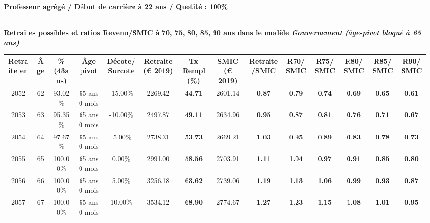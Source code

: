 {\bf \noindent Professeur agrégé / Début de carrière à 22 ans / Quotité : 100\%}  ~ 

 ~\\{\bf \noindent Retraites possibles et ratios Revenu/SMIC à 70, 75, 80, 85, 90 ans dans le modèle \emph{Gouvernement (âge-pivot bloqué à 65 ans)}}  
 
\begin{adjustbox}{max width=\textwidth} 
\begin{tabular}[htb]{|c|c||c|c|c||c|c||c|c||c|c|c|c|c|} 
\hline 
 Retraite en &  Âge &  \%(43ans) &  Âge pivot &  Décote/Surcote &  Retraite (\euro{} 2019) &  Tx Rempl(\%) &  SMIC (\euro{} 2019) &  Retraite/SMIC &  R70/SMIC &  R75/SMIC &  R80/SMIC &  R85/SMIC &  R90/SMIC \\ 
\hline \hline 
 2052 &  62 &  93.02\% &  65 ans 0 mois &  -15.00\% &  2269.42 &  {\bf 44.71} &  2601.14 &  {\bf {\color{red} 0.87}} &  {\bf {\color{red} 0.79}} &  {\bf {\color{red} 0.74}} &  {\bf {\color{red} 0.69}} &  {\bf {\color{red} 0.65}} &  {\bf {\color{red} 0.61}} \\ 
\hline 
 2053 &  63 &  95.35\% &  65 ans 0 mois &  -10.00\% &  2497.87 &  {\bf 49.11} &  2634.96 &  {\bf {\color{red} 0.95}} &  {\bf {\color{red} 0.87}} &  {\bf {\color{red} 0.81}} &  {\bf {\color{red} 0.76}} &  {\bf {\color{red} 0.71}} &  {\bf {\color{red} 0.67}} \\ 
\hline 
 2054 &  64 &  97.67\% &  65 ans 0 mois &  -5.00\% &  2738.31 &  {\bf 53.73} &  2669.21 &  {\bf 1.03} &  {\bf {\color{red} 0.95}} &  {\bf {\color{red} 0.89}} &  {\bf {\color{red} 0.83}} &  {\bf {\color{red} 0.78}} &  {\bf {\color{red} 0.73}} \\ 
\hline 
 2055 &  65 &  100.00\% &  65 ans 0 mois &  0.00\% &  2991.00 &  {\bf 58.56} &  2703.91 &  {\bf 1.11} &  {\bf 1.04} &  {\bf {\color{red} 0.97}} &  {\bf {\color{red} 0.91}} &  {\bf {\color{red} 0.85}} &  {\bf {\color{red} 0.80}} \\ 
\hline 
 2056 &  66 &  100.00\% &  65 ans 0 mois &  5.00\% &  3256.18 &  {\bf 63.62} &  2739.06 &  {\bf 1.19} &  {\bf 1.13} &  {\bf 1.06} &  {\bf {\color{red} 0.99}} &  {\bf {\color{red} 0.93}} &  {\bf {\color{red} 0.87}} \\ 
\hline 
 2057 &  67 &  100.00\% &  65 ans 0 mois &  10.00\% &  3534.12 &  {\bf 68.90} &  2774.67 &  {\bf 1.27} &  {\bf 1.23} &  {\bf 1.15} &  {\bf 1.08} &  {\bf 1.01} &  {\bf {\color{red} 0.95}} \\ 
\hline 
\hline 
\end{tabular} 
\end{adjustbox} 
 
